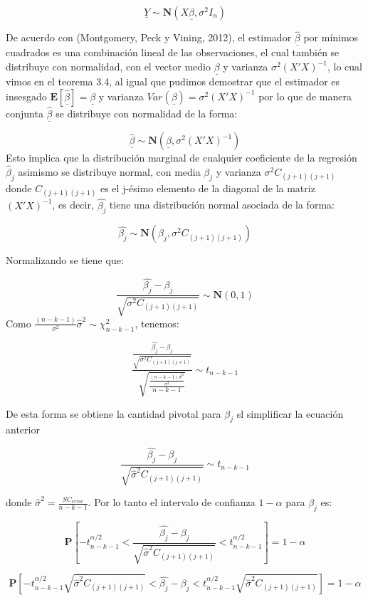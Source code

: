 \documentclass[a4paper,oneside,openany]{book}
\begin{document}
\[\underline{Y} \sim \mathbf{N}(X\underline{\beta},\sigma^2 I_{n})\]

De acuerdo con (Montgomery, Peck y Vining, 2012), el estimador
\(\underline{\hat{\beta}}\) por mínimos cuadrados es una combinación
lineal de las observaciones, el cual también se distribuye con
normalidad, con el vector medio \(\underline{\beta}\) y varianza
\(\sigma^2(X'X)^{-1}\), lo cual vimos en el teorema 3.4, al igual que
pudimos demostrar que el estimador es insesgado
\(\mathbf{E}[\underline{\hat{\beta}}]=\underline{\beta}\) y varianza
\(Var(\underline{\beta})=\sigma^2(X'X)^{-1}\) por lo que de manera
conjunta \(\underline{\hat{\beta}}\) se distribuye con normalidad de la
forma:

\[\underline{\hat{\beta}} \sim \mathbf{N}(\underline{\beta},\sigma^2(X'X)^{-1})\]
Esto implica que la distribución marginal de cualquier coeficiente de la
regresión \(\hat{\beta}_{j}\) asimismo se distribuye normal, con media
\(\beta_{j}\) y varianza \(\sigma^2 C_{(j+1)(j+1)}\) donde
\(C_{(j+1)(j+1)}\) es el j-ésimo elemento de la diagonal de la matriz
\((X'X)^{-1}\), es decir, \(\hat{\beta_{j}}\) tiene una distribución
normal asociada de la forma:

\[\hat{\beta_{j}} \sim \mathbf{N}(\beta_{j}, \sigma^2C_{(j+1)(j+1)})\]

Normalizando se tiene que:

\[\frac{\hat{\beta_{j}}-\beta_{j}}{\sqrt{\sigma^2C_{(j+1)(j+1)}}}\sim \mathbf{N}(0,1)\]
Como \(\frac{(n-k-1)}{\sigma^2}\hat{\sigma}^2 \sim \chi^2_{n-k-1}\),
tenemos:

\[\frac{\frac{\hat{\beta_{j}}-\beta_{j}}{\sqrt{\sigma^2C_{(j+1)(j+1)}}}}{\sqrt{\frac{\frac{(n-k-1)\hat{\sigma}^2}{\sigma^2}}{n-k-1}}} \sim t_{n-k-1}\]

De esta forma se obtiene la cantidad pivotal para \(\beta_{j}\) sl
simplificar la ecuación anterior

\[\frac{\hat{\beta_{j}}-\beta_{j}}{\sqrt{\hat{\sigma}^2C_{(j+1)(j+1)}}}\sim t_{n-k-1}\]

donde \(\hat{\sigma}^2=\frac{SC_{error}}{n-k-1}\). Por lo tanto el
intervalo de confianza \(1-\alpha\) para \(\beta_{j}\) es:

\[\mathbf{P} \left[-t^{\alpha/2}_{n-k-1} < \frac{\hat{\beta_{j}}-\beta_{j}}{\sqrt{\hat{\sigma}^2C_{(j+1)(j+1)}}} < t^{\alpha/2}_{n-k-1} \right]= 1- \alpha\]

\[\mathbf{P} \left[-t^{\alpha/2}_{n-k-1}{\sqrt{\hat{\sigma}^2C_{(j+1)(j+1)}}} < \hat{\beta_{j}}-\beta_{j} < t^{\alpha/2}_{n-k-1}{\sqrt{\hat{\sigma}^2C_{(j+1)(j+1)}}} \right]= 1- \alpha\]
\end{document}
